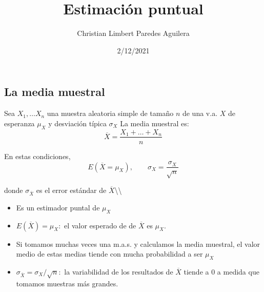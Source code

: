 \documentclass[
]{article}
\title{Estimación puntual}
\author{Christian Limbert Paredes Aguilera}
\date{2/12/2021}
\begin{document}
\maketitle

\hypertarget{la-media-muestral}{%
\subsection{La media muestral}\label{la-media-muestral}}

Sea \(X_1,\ldots X_n\) una muestra aleatoria simple de tamaño \(n\) de
una v.a. \(X\) de esperanza \(\mu_X\) y desviación típica \(\sigma_X\)
La media muestral es: \[\overline{X} = \dfrac{X_1+\ldots + X_n}{n}\]

En estas condiciones,
\[E(\overline{X}=\mu_X),\qquad \sigma_X = \dfrac{\sigma_X}{\sqrt{n}}\]

donde \(\sigma_{\overline{X}}\) es el error estándar de
\(\overline{X}\)\textbackslash\textbackslash{}

\begin{itemize}
\item Es un estimador puntal de $\mu_X$
\item $E(\overline{X})=\mu_X:$ el valor esperado de de $\overline{X}$ es $\mu_X$.
\item Si tomamos muchas veces una m.a.s. y calculamos la media muestral, el valor medio de estas medias tiende con mucha probabilidad a ser $\mu_X$
\item $\sigma_{\overline{X}} = \sigma_X / \sqrt{n}:$ la variabilidad de los resultados de $\overline{X}$ tiende a $0$ a medida que tomamos muestras más grandes.
\end{itemize}
\end{document}
